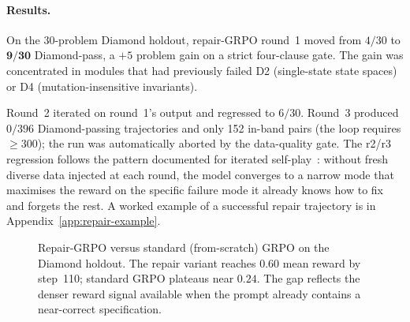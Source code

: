 \documentclass[11pt]{article}
\begin{document}
\paragraph{Results.}
On the 30-problem Diamond holdout, repair-GRPO round~1 moved from
$4/30$ to $\mathbf{9/30}$ Diamond-pass, a $+5$ problem gain on a
strict four-clause gate.  The gain was concentrated in modules
that had previously failed D2 (single-state state spaces) or D4
(mutation-insensitive invariants).

Round~2 iterated on round~1's output and regressed to $6/30$.
Round~3 produced $0/396$ Diamond-passing trajectories and only 152
in-band pairs (the loop requires $\geq 300$); the run was
automatically aborted by the data-quality gate.
The r2/r3 regression follows the pattern documented for iterated
self-play~\cite{gulcehre2023rest}: without fresh diverse data
injected at each round, the model converges to a narrow mode that
maximises the reward on the specific failure mode it already knows
how to fix and forgets the rest.  A worked example of a successful
repair trajectory is in Appendix~\ref{app:repair-example}.

\begin{figure}[t]
\centering
{}
\caption{Repair-GRPO versus standard (from-scratch) GRPO on the
Diamond holdout.  The repair variant reaches $0.60$ mean reward by
step~110; standard GRPO plateaus near $0.24$.  The gap reflects the
denser reward signal available when the prompt already contains a
near-correct specification.}
\label{fig:grpo-curve}
\end{figure}
\end{document}
